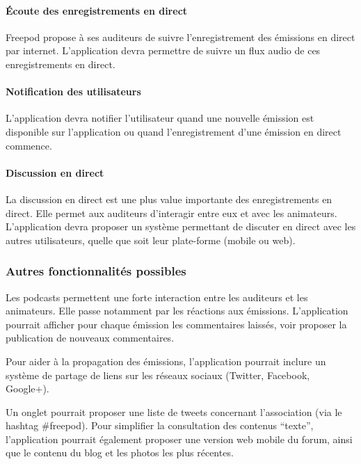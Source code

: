 \documentclass[11pt, french]{report}
\begin{document}
\paragraph{Écoute des enregistrements en direct}

Freepod propose à ses auditeurs de suivre l’enregistrement des émissions en direct par internet. L’application devra permettre de suivre un flux audio de ces enregistrements en direct.

\paragraph{Notification des utilisateurs}

L’application devra notifier l’utilisateur quand une nouvelle émission est disponible sur l’application ou quand l’enregistrement d’une émission en direct commence.

\paragraph{Discussion en direct}

La discussion en direct est une plus value importante des enregistrements en direct. Elle permet aux auditeurs d'interagir entre eux et avec les animateurs. L’application devra proposer un système permettant de discuter en direct avec les autres utilisateurs, quelle que soit leur plate-forme (mobile ou web).

\subsubsection{Autres fonctionnalités possibles}

Les podcasts permettent une forte interaction entre les auditeurs et les animateurs. Elle passe notamment par les réactions aux émissions. L’application pourrait afficher pour chaque émission les commentaires laissés, voir proposer la publication de nouveaux commentaires.

Pour aider à la propagation des émissions, l’application pourrait inclure un système de partage de liens sur les réseaux sociaux (Twitter, Facebook, Google+).

Un onglet pourrait proposer une liste de tweets concernant l’association (via le hashtag \#freepod).
Pour simplifier la consultation des contenus “texte”, l’application pourrait également proposer une version web mobile du forum, ainsi que le contenu du blog et les photos les plus récentes.
\end{document}

